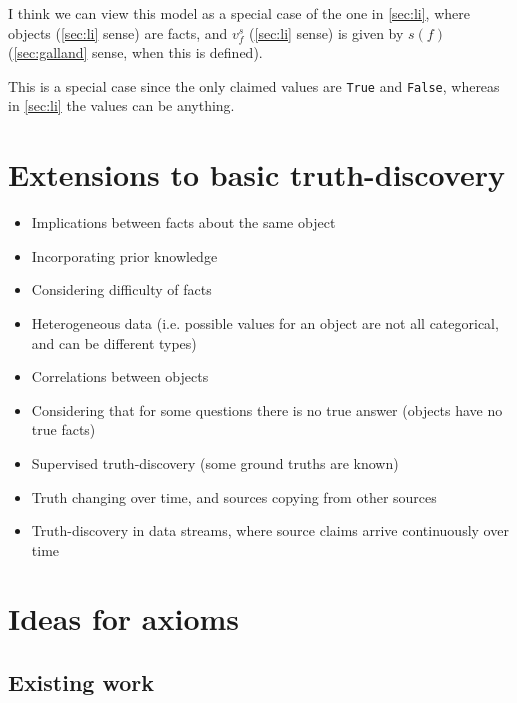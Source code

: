 \documentclass{article}
\theoremstyle{definition} \newtheorem{definition}{Definition}
\theoremstyle{definition} \newtheorem{example}{Example}
\theoremstyle{plain} \newtheorem{axiom}{Axiom}
\theoremstyle{plain} \newtheorem*{remark}{Remark}
\theoremstyle{remark} \newtheorem*{notation}{Notation}
\theoremstyle{plain} \newtheorem{lemma}{Lemma}
\theoremstyle{plain} \newtheorem{proposition}{Proposition}
\begin{document}
I think we can view this model as a special case of the one in \ref{sec:li},
where objects (\ref{sec:li} sense) are facts, and $v_f^s$ (\ref{sec:li} sense)
is given by $s(f)$ (\ref{sec:galland} sense, when this is defined).

This is a special case since the only claimed values are \texttt{True} and
\texttt{False}, whereas in \ref{sec:li} the values can be anything.

\section{Extensions to basic truth-discovery}
\begin{itemize}

\item Implications between facts about the same object{\cite{yin_han_yu}}
\item Incorporating prior knowledge{\cite{pasternack}}
\item Considering difficulty of facts{\cite{galland}}
\item Heterogeneous data (i.e. possible values for an object are not all
categorical, and can be different types){\cite{li_conflicts}}
\item Correlations between objects{\cite{yang}}
\item Considering that for some questions there is no true answer (objects have
no true facts){\cite{zhi}}
\item Supervised truth-discovery (some ground truths are
known){\cite{yin_supervised}}
\item Truth changing over time, and sources copying from other
sources{\cite{dong}}
\item Truth-discovery in data streams, where source claims arrive continuously
over time{\cite{zhao}}

\end{itemize}

\section{Ideas for axioms}

\subsection{Existing work}
\end{document}

